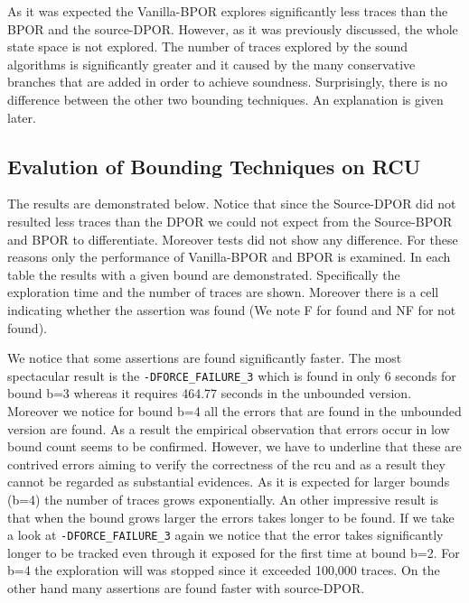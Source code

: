 As it was expected the Vanilla-BPOR explores significantly less traces than the BPOR and the source-DPOR. However, as it was previously discussed, the whole
state space is not explored. The number of traces explored by the sound algorithms is significantly greater and it caused by the many conservative branches that are
added in order to achieve soundness. Surprisingly, there is no difference between the other two bounding techniques. An explanation is given later.

\subsection{Evalution of Bounding Techniques on RCU}
The results are demonstrated below. Notice that since the Source-DPOR did not resulted less traces than the DPOR we could not expect from the Source-BPOR and BPOR
to differentiate. Moreover tests did not show any difference. For these reasons only the performance of Vanilla-BPOR and BPOR is examined. In each table
the results with a given bound are demonstrated. Specifically the exploration time and the number of traces are shown. 
Moreover there is a cell indicating whether the assertion was found (We note F for found and NF for not found).




We notice that some assertions are found significantly faster. The most spectacular result is the \verb|-DFORCE_FAILURE_3| which is found in only 6 seconds for bound b=3 whereas it requires 464.77 seconds in the unbounded version. Moreover we notice for bound b=4 all the errors that are found in the unbounded version are
found. As a result the empirical observation that errors occur in low bound count seems to be confirmed. However, we have to underline that these are contrived
errors aiming to verify the correctness of the rcu and as a result they cannot be regarded as substantial evidences. As it is expected for larger bounds (b=4) the number of traces
grows exponentially. An other impressive result is that when the bound grows larger the errors takes longer to be found. If we take a look at \verb|-DFORCE_FAILURE_3| again we notice that the error
takes significantly longer to be tracked even through it exposed for the first time at bound b=2. For b=4 the exploration will was stopped since it exceeded 100,000 traces.
On the other hand many assertions are found faster with source-DPOR.

